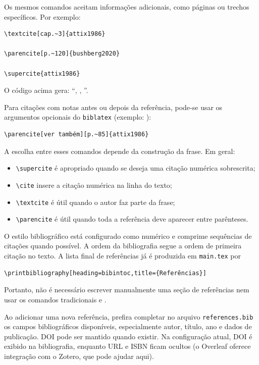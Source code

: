 Os mesmos comandos aceitam informações adicionais, como páginas ou trechos específicos. Por exemplo:

\begin{verbatim}
\textcite[cap.~3]{attix1986}

\parencite[p.~120]{bushberg2020}

\supercite{attix1986}
\end{verbatim}

O código acima gera: ``\textcite[cap.~3]{attix1986}, \parencite[p.~120]{bushberg2020},  \supercite{attix1986}''.


Para citações com notas antes ou depois da referência, pode-se usar os argumentos opcionais do \verb|biblatex| (exemplo: \parencite[ver também][p.~85]{attix1986}):

\begin{verbatim}
\parencite[ver também][p.~85]{attix1986}
\end{verbatim}

A escolha entre esses comandos depende da construção da frase. Em geral:

\begin{itemize}
  \item \verb|\supercite| é apropriado quando se deseja uma citação
        numérica sobrescrita;
  \item \verb|\cite| insere a citação numérica na linha do texto;
  \item \verb|\textcite| é útil quando o autor faz parte da frase;
  \item \verb|\parencite| é útil quando toda a referência deve aparecer
        entre parênteses.
\end{itemize}

O estilo bibliográfico está configurado como numérico e comprime sequências de citações quando possível. A ordem da bibliografia segue a ordem de primeira citação no texto. A lista final de referências já é produzida em \verb|main.tex| por

\begin{verbatim}
\printbibliography[heading=bibintoc,title={Referências}]
\end{verbatim}

Portanto, não é necessário escrever manualmente uma seção de referências nem usar os comandos tradicionais \verb|| e \verb||.

Ao adicionar uma nova referência, prefira completar no arquivo \verb|references.bib| os campos bibliográficos disponíveis, especialmente autor, título, ano e dados de publicação. DOI pode ser mantido quando existir. Na configuração atual, DOI é exibido na bibliografia, enquanto URL e ISBN ficam ocultos (o Overleaf oferece integração com o Zotero, que pode ajudar aqui).


